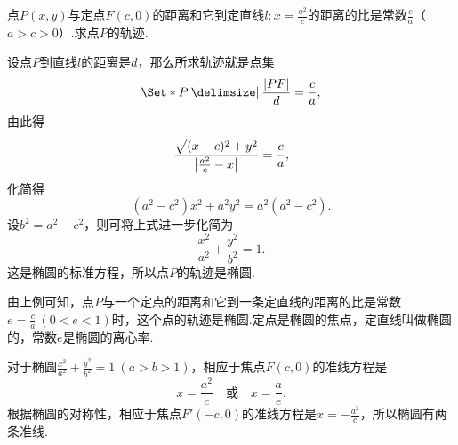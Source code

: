 \begin{example}
点\(P(x,y)\)与定点\(F(c,0)\)的距离和它到定直线\(l: x = \frac{a^2}{c}\)的距离的比是常数\(\frac{c}{a}\)（\(a > c > 0\)）.求点\(P\)的轨迹.
\begin{solution}
设点\(P\)到直线\(l\)的距离是\(d\)，那么所求轨迹就是点集\[
\Set*{ P \given \frac{\abs{PF}}{d} = \frac{c}{a} },
\]由此得\[
\frac{\sqrt{(x-c)^2+y^2}}{\abs{\frac{a^2}{c}-x}} = \frac{c}{a},
\]化简得\[
(a^2-c^2)x^2 + a^2 y^2 = a^2(a^2-c^2).
\]设\(b^2=a^2-c^2\)，则可将上式进一步化简为\[
\frac{x^2}{a^2}+\frac{y^2}{b^2}=1.
\]这是椭圆的标准方程，所以点\(P\)的轨迹是椭圆.
\end{solution}

由上例可知，点\(P\)与一个定点的距离和它到一条定直线的距离的比是常数\(e = \frac{c}{a}\ (0 < e < 1)\)时，这个点的轨迹是椭圆.定点是椭圆的焦点，定直线叫做椭圆的，常数\(e\)是椭圆的离心率.

对于椭圆\(\frac{x^2}{a^2}+\frac{y^2}{b^2}=1\ (a>b>1)\)，相应于焦点\(F(c,0)\)的准线方程是\[
x = \frac{a^2}{c}
\quad\text{或}\quad
x = \frac{a}{e}.
\]根据椭圆的对称性，相应于焦点\(F'(-c,0)\)的准线方程是\(x=-\frac{a^2}{c}\)，所以椭圆有两条准线.
\end{example}

